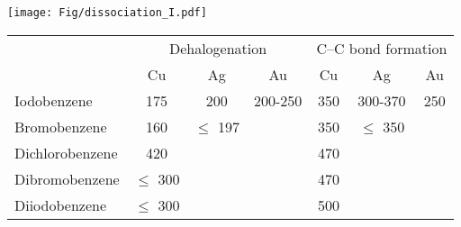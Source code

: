 \documentclass[aps,prl,reprint,amsmath,amssymb,floatfix,notitlepage]{revtex4-1}
\begin{document}
\begin{figure*}[hbt]
\centering
\texttt{[image: Fig/dissociation\_I.pdf]}
\caption{Dissociation of the C--I bond on Cu(111). The energy diagram shows the NEB profile of the deiodination process. In the structural images, orange, cyan, white, purple spheres represent copper, carbon, hydrogen, iodine atoms, respectively.}
\label{fig:dissociation_I}
\end{figure*}

\begin{table*}
\centering\caption{Minimum experimentally measured temperatures (\si{\kelvin}) necessary for the completion of the two key Ullmann compling steps.}
\begin{tabular}{ lcccccc }
 \hline
 \hline
  & \multicolumn{3}{c}{Dehalogenation} & \multicolumn{3}{c}{C--C bond formation} \\
  &\multicolumn{1}{c}{Cu} &\multicolumn{1}{c}{Ag} & \multicolumn{1}{c}{Au} & \multicolumn{1}{c}{Cu} &\multicolumn{1}{c}{Ag} &\multicolumn{1}{c}{Au}\\
 \hline
 Iodobenzene             &175\cite{sur_sci01} &200\cite{sur_sci02} &200-250\cite{sur_sci03} &350\cite{ullmann_68} &300-370\cite{ullmann_68} &250\cite{sur_sci03}\\
 Bromobenzene  &160\cite{ullmann_67} &$\leq$ 197\cite{sur_sci02}  &  &350\cite{ullmann_67}  &$\leq$ 350\cite{sur_sci02}  & \\
 Dichlorobenzene &420\cite{ullmann_52} & & &470\cite{ullmann_52} & & \\
 Dibromobenzene &$\leq$ 300\cite{ullmann_52} & & &470\cite{ullmann_98}  & & \\
 Diiodobenzene &$\leq$ 300\cite{ullmann_52} & & &500 \cite{ullmann_88} & & \\
 \hline
 \hline
\end{tabular}
\label{table:experimental-temperatures}
\end{table*}
\end{document}

